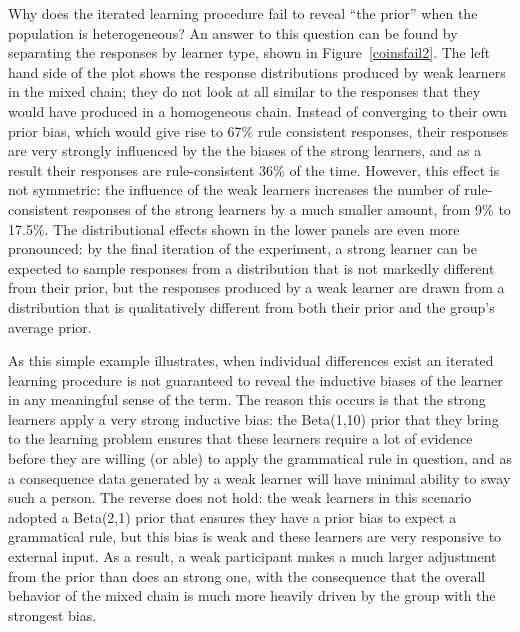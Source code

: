\documentclass[doc]{apa6}
\begin{document}
Why does the iterated learning procedure fail to reveal ``the prior'' when the population is heterogeneous? An answer to this question can be found by separating the responses by learner type, shown in Figure~\ref{coinsfail2}. The left hand side of the plot shows the response distributions produced by {\sc weak} learners in the mixed chain; they do not look at all similar to the responses that they would have produced in a homogeneous chain. Instead of converging to their own prior bias, which would give rise to 67\% rule consistent responses, their responses are very strongly influenced by the the biases of the {\sc strong} learners, and as a result their responses are rule-consistent 36\% of the time. However, this effect is not symmetric: the influence of the {\sc weak} learners increases the number of rule-consistent responses of the {\sc strong} learners by a much smaller amount, from 9\% to 17.5\%. The distributional effects shown in the lower panels are even more pronounced: by the final iteration of the experiment, a {\sc strong} learner can be expected to sample responses from a distribution that is not markedly different from their prior, but the responses produced by a {\sc weak} learner are drawn from a distribution that is qualitatively different from both their prior and the group's average prior. 

As this simple example illustrates, when individual differences exist an iterated learning procedure is not guaranteed to reveal the inductive biases of the learner in any meaningful sense of the term. The reason this occurs is that the {\sc strong} learners apply a very strong inductive bias: the Beta(1,10) prior that they bring to the learning problem ensures that these learners require a lot of evidence before they are willing (or able) to apply the grammatical rule in question, and as a consequence data generated by a {\sc weak} learner will have minimal ability to sway such a person. The reverse does not hold: the {\sc weak} learners in this scenario adopted a Beta(2,1) prior that ensures they have a prior bias to expect a grammatical rule, but this bias is weak and these learners are very responsive to external input. As a result, a {\sc weak} participant makes a much larger adjustment from the prior than does an {\sc strong} one, with the consequence that the overall behavior of the mixed chain is much more heavily driven by the group with the strongest bias.
\end{document}
